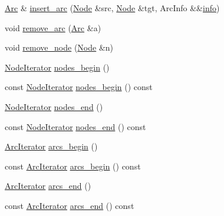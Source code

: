 \begin{DoxyCompactItemize}
\item 
\hyperlink{class_designar_1_1_digraph_a0ceb278671f2a535c00fddccdeafd69f}{Arc} \& \hyperlink{class_designar_1_1_digraph_a9e46012a65696859c131d0bc5e096f55}{insert\+\_\+arc} (\hyperlink{class_designar_1_1_digraph_a4dc921c41a480b7946a04170e997d8ae}{Node} \&src, \hyperlink{class_designar_1_1_digraph_a4dc921c41a480b7946a04170e997d8ae}{Node} \&tgt, Arc\+Info \&\&\hyperlink{class_designar_1_1_digraph_aec655bb1b26775cb7ad3581240290efe}{info})
\item 
void \hyperlink{class_designar_1_1_digraph_a278b6cb034c19daa52d58aa3312783d6}{remove\+\_\+arc} (\hyperlink{class_designar_1_1_digraph_a0ceb278671f2a535c00fddccdeafd69f}{Arc} \&a)
\item 
void \hyperlink{class_designar_1_1_digraph_a85051637ba641bacb8d42b9cd9e91c40}{remove\+\_\+node} (\hyperlink{class_designar_1_1_digraph_a4dc921c41a480b7946a04170e997d8ae}{Node} \&n)
\item 
\hyperlink{class_designar_1_1_digraph_1_1_node_iterator}{Node\+Iterator} \hyperlink{class_designar_1_1_digraph_af2a2ede7d4af852e67705f2c2bf394d2}{nodes\+\_\+begin} ()
\item 
const \hyperlink{class_designar_1_1_digraph_1_1_node_iterator}{Node\+Iterator} \hyperlink{class_designar_1_1_digraph_a6fcecdd41bdd4af1a0e1a7a5a3e8a3eb}{nodes\+\_\+begin} () const
\item 
\hyperlink{class_designar_1_1_digraph_1_1_node_iterator}{Node\+Iterator} \hyperlink{class_designar_1_1_digraph_a67917506d721e541955aa2a639b94759}{nodes\+\_\+end} ()
\item 
const \hyperlink{class_designar_1_1_digraph_1_1_node_iterator}{Node\+Iterator} \hyperlink{class_designar_1_1_digraph_a82c01284de2fc81c7bd04c13d8861d9a}{nodes\+\_\+end} () const
\item 
\hyperlink{class_designar_1_1_digraph_1_1_arc_iterator}{Arc\+Iterator} \hyperlink{class_designar_1_1_digraph_a56949c616f1aec38783434102072c3ad}{arcs\+\_\+begin} ()
\item 
const \hyperlink{class_designar_1_1_digraph_1_1_arc_iterator}{Arc\+Iterator} \hyperlink{class_designar_1_1_digraph_a1334cd9030f2a409f03a611bb472f5cb}{arcs\+\_\+begin} () const
\item 
\hyperlink{class_designar_1_1_digraph_1_1_arc_iterator}{Arc\+Iterator} \hyperlink{class_designar_1_1_digraph_af4e39baa2e8370cfda5f61f551b3091f}{arcs\+\_\+end} ()
\item 
const \hyperlink{class_designar_1_1_digraph_1_1_arc_iterator}{Arc\+Iterator} \hyperlink{class_designar_1_1_digraph_a128df54ce973f5b1f956407a7f565bc3}{arcs\+\_\+end} () const

\end{DoxyCompactItemize}
